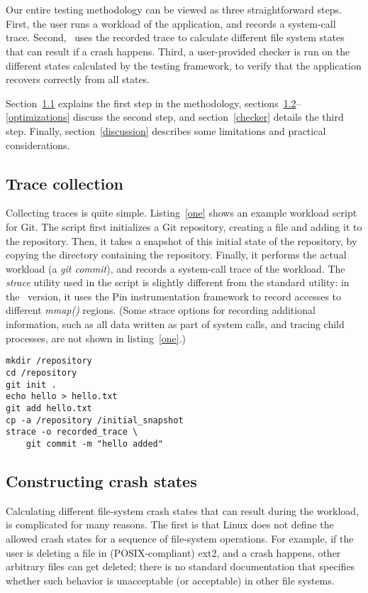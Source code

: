 \setlength{\textfloatsep}{16pt}
\setlength{\floatsep}{16pt}
\section{\Kassandra}
Our entire testing methodology can be viewed as three straightforward steps. First, the user runs a workload of the application, and records a system-call trace. Second, \Kassandra\ uses the recorded trace to calculate different file system states that can result if a crash happens. Third, a user-provided checker is run on the different states calculated by the testing framework, to verify that the application recovers correctly from all states.

Section~\ref{tracecollection} explains the first step in the methodology, sections~\ref{crashstate}--\ref{optimizations} discuss the second step, and section~\ref{checker} details the third step. Finally, section~\ref{discussion} describes some limitations and practical considerations.

\subsection{Trace collection}
\label{tracecollection}
Collecting traces is quite simple. Listing~\ref{one} shows an example workload script for Git. The script first initializes a Git repository, creating a file and adding it to the repository. Then, it takes a snapshot of this initial state of the repository, by copying the directory containing the repository. Finally, it performs the actual workload (a {\it git commit}), and records a system-call trace of the workload. The {\it strace} utility used in the script is slightly different from the standard utility: in the \Kassandra\ version, it uses the Pin instrumentation framework to record accesses to different {\it mmap()} regions. (Some strace options for recording additional information, such as all data written as part of system calls, and tracing child processes, are not shown in listing~\ref{one}.)
\begin{lstlisting}[float=t, caption = {\textbf{Workload script.}}, label = {one}, escapechar=!]
mkdir /repository
cd /repository
git init .
echo hello > hello.txt
git add hello.txt
cp -a /repository /initial_snapshot
strace -o recorded_trace \
	git commit -m "hello added"
\end{lstlisting}

\subsection{Constructing crash states}
\label{crashstate}
Calculating different file-system crash states that can result during the workload, is complicated for many reasons. The first is that Linux does not define the allowed crash states for a sequence of file-system operations. For example, if the user is deleting a file in (POSIX-compliant) ext2, and a crash happens, other arbitrary files can get deleted; there is no standard documentation that specifies whether such behavior is unacceptable (or acceptable) in other file systems.

